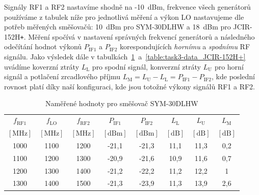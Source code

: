 \documentclass[11pt,a4paper]{article}
\newcommand{\plus}{{\texttt{+}}}
\begin{document}
Signály RF1 a RF2 nastavíme shodně na -10~dBm, frekvence všech generátorů používáme z tabulek níže pro jednotlivá měření a výkon LO nastavujeme dle potřeb měřených směšovačů: 10~dBm pro SYM-30DLHW a 18~dBm pro JCIR-152H\plus. Měření spočívá v nastavení správných frekvencí generátorů a následného odečítání hodnot výkonů $P_{\mathrm{IF1}}$ a $P_{\mathrm{IF2}}$ korespondujících \emph{hornímu} a \emph{spodnímu} RF signálu. Jako výsledek dále v tabulkách~\ref{table:task3-data_SYM-30DLHW}~a~\ref{table:task3-data_JCIR-152H+} uvádíme koverzní ztráty $L_{\mathrm L}$ pro spodní signál, konverzní ztráty $L_{\mathrm U}$ pro horní signál a potlačení zrcadlového příjmu $L_{\mathrm M} = L_{\mathrm U} - L_{\mathrm L} = P_{\mathrm{IF1}} - P_{\mathrm{IF2}}$, kde poslední rovnost platí díky naší konfiguraci, kde jsou totožné výkony signálů RF1 a RF2.
\begin{table}[!ht]
    \centering
    \begin{tabular}{| c | c | c || c | c || c | c | c |}
        \hline
        $f_{\mathrm{RF1}}$ & $f_{\mathrm{LO}}$ & $f_{\mathrm{RF2}}$ & $P_{\mathrm{IF1}}$ & $P_{\mathrm{IF2}}$ & $L_{\mathrm{L}}$ & $L_{\mathrm{U}}$ & $L_{\mathrm{M}}$\\
        $[\mathrm{MHz}]$ & $[\mathrm{MHz}]$ & $[\mathrm{MHz}]$ & $[\mathrm{dBm}]$ & $[\mathrm{dBm}]$ & $[\mathrm{dB}]$ & $[\mathrm{dB}]$ & $[\mathrm{dB}]$\\
        \hline\hline
        1000 & 1100 & 1200 & -21,1 & -21,3 & 11,1 & 11,3 & 0,2\\
        \hline
        1100 & 1200 & 1300 & -20,9 & -21,6 & 10,9 & 11,6 & 0,7\\
        \hline
        1200 & 1300 & 1400 & -21,2 & -22,2 & 11,2 & 12,2 & 1\\
        \hline
        1300 & 1400 & 1500 & -21,3 & -23,9 & 11,3 & 13,9 & 2,6\\
        \hline
    \end{tabular}
    \caption{Naměřené hodnoty pro směšovač SYM-30DLHW}
    \label{table:task3-data_SYM-30DLHW}
\end{table}
\end{document}
